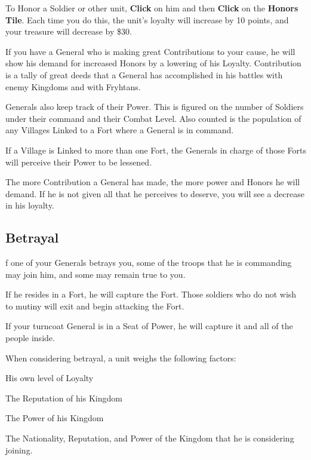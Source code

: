 To Honor a Soldier or other unit, \textbf{Click} on him and then \textbf{Click} on the \textbf{Honors Tile}. Each time you do this, the unit’s loyalty will increase by 10 points, and your treasure will decrease by \$30.

If you have a General who is making great Contributions to your cause, he will show his demand for increased Honors by a lowering of his Loyalty. Contribution is a tally of great deeds that a General has accomplished in his battles with enemy Kingdoms and with Fryhtans.

Generals also keep track of their Power. This is figured on the number of Soldiers under their command and their Combat Level. Also counted is the population of any Villages Linked to a Fort where a General is in command.

If a Village is Linked to more than one Fort, the Generals in charge of those Forts will perceive their Power to be lessened.

The more Contribution a General has made, the more power and Honors he will demand. If he is not given all that he perceives to deserve, you will see a decrease in his loyalty.

\subsection{Betrayal}


f one of your Generals betrays you, some of the troops that he is commanding may join him, and some may remain true to you.

If he resides in a Fort, he will capture the Fort. Those soldiers who do not wish to mutiny will exit and begin attacking the Fort.

If your turncoat General is in a Seat of Power, he will capture it and all of the people inside.

When considering betrayal, a unit weighs the following factors:

\begin{changemargin}{.5cm}{0cm}
His own level of Loyalty

The Reputation of his Kingdom

The Power of his Kingdom

The Nationality, Reputation, and Power of the Kingdom that he is considering joining.
\end{changemargin}